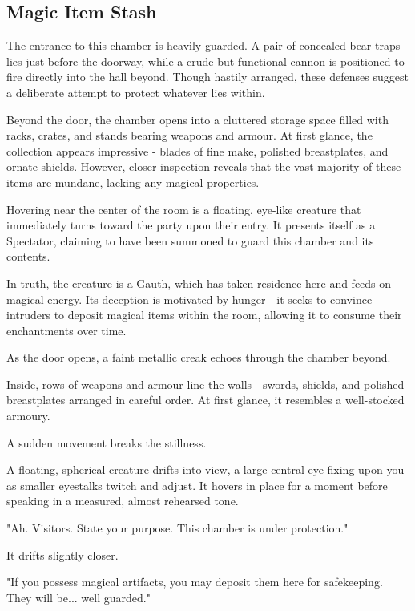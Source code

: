 \subsection*{ Magic Item Stash}
{\entryfont The entrance to this chamber is heavily guarded. A pair of concealed bear traps lies just before the doorway, while a crude but functional cannon is positioned to fire directly into the hall beyond. Though hastily arranged, these defenses suggest a deliberate attempt to protect whatever lies within.

Beyond the door, the chamber opens into a cluttered storage space filled with racks, crates, and stands bearing weapons and armour. At first glance, the collection appears impressive - blades of fine make, polished breastplates, and ornate shields. However, closer inspection reveals that the vast majority of these items are mundane, lacking any magical properties.

Hovering near the center of the room is a floating, eye-like creature that immediately turns toward the party upon their entry. It presents itself as a Spectator, claiming to have been summoned to guard this chamber and its contents.

In truth, the creature is a Gauth, which has taken residence here and feeds on magical energy. Its deception is motivated by hunger - it seeks to convince intruders to deposit magical items within the room, allowing it to consume their enchantments over time.}
\begin{DndReadAloud}
	As the door opens, a faint metallic creak echoes through the chamber beyond.

	Inside, rows of weapons and armour line the walls - swords, shields, and polished breastplates arranged in careful order. At first glance, it resembles a well-stocked armoury.

	A sudden movement breaks the stillness.

	A floating, spherical creature drifts into view, a large central eye fixing upon you as smaller eyestalks twitch and adjust. It hovers in place for a moment before speaking in a measured, almost rehearsed tone.

	"Ah. Visitors. State your purpose. This chamber is under protection."

	It drifts slightly closer.

	"If you possess magical artifacts, you may deposit them here for safekeeping. They will be... well guarded."
\end{DndReadAloud}
